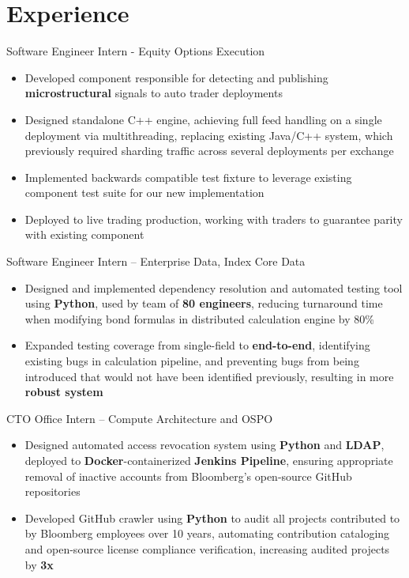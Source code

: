 \documentclass[letterpaper,11pt]{article}
\begin{document}
\section{Experience}
{Software Engineer Intern - Equity Options Execution}{}
\begin{itemize}
  \item Developed component responsible for detecting and publishing \textbf{microstructural}
        signals to auto trader deployments
  \item Designed standalone C++ engine, achieving full feed handling on a single
        deployment via multithreading, replacing existing Java/C++ system, which
        previously required sharding traffic across several deployments per exchange
  \item Implemented backwards compatible test fixture to leverage existing component
        test suite for our new implementation
  \item Deployed to live trading production, working with traders to guarantee parity
        with existing component
\end{itemize}
{Software Engineer Intern -- Enterprise Data, Index Core Data}{}
\begin{itemize}
  \item Designed and implemented dependency resolution and automated testing
        tool using \textbf{Python}, used by team of \textbf{80 engineers},
        reducing turnaround time when modifying bond formulas in distributed
        calculation engine by 80\%
  \item Expanded testing coverage from single-field to \textbf{end-to-end}, identifying
        existing bugs in calculation pipeline, and preventing bugs from being
        introduced that would not have been identified previously, resulting in
        more \textbf{robust system}
\end{itemize}
{CTO Office Intern -- Compute Architecture and OSPO}{}
\begin{itemize}
  \item Designed automated access revocation system using \textbf{Python} and
        \textbf{LDAP}, deployed to \textbf{Docker}-containerized
        \textbf{Jenkins Pipeline}, ensuring appropriate removal of inactive
        accounts from Bloomberg's open-source GitHub repositories
  \item Developed GitHub crawler using \textbf{Python} to audit all projects
        contributed to by Bloomberg employees over 10 years, automating
        contribution cataloging and open-source license compliance
        verification, increasing audited projects by \textbf{3x}
\end{itemize}
\end{document}
